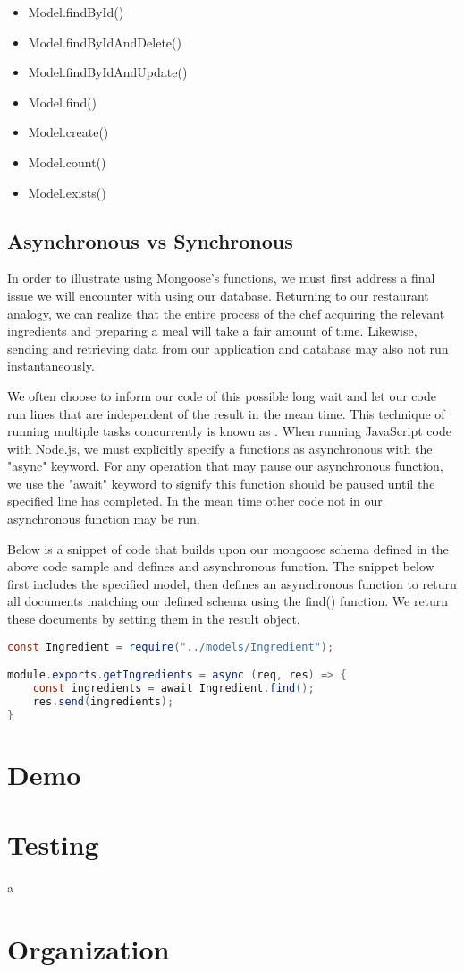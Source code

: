 \begin{itemize}
    \item Model.findById()
    \item Model.findByIdAndDelete()
    \item Model.findByIdAndUpdate()
    \item Model.find()
    \item Model.create()
    \item Model.count()
    \item Model.exists()
\end{itemize}

\subsection{Asynchronous vs Synchronous}

In order to illustrate using Mongoose's functions, we must first address a final issue we will encounter with using our database. Returning to our restaurant analogy, we can realize that the entire process of the chef acquiring the relevant ingredients and preparing a meal will take a fair amount of time. Likewise, sending and retrieving data from our application and database may also not run instantaneously.

We often choose to inform our code of this possible long wait and let our code run lines that are independent of the result in the mean time. This technique of running multiple tasks concurrently is known as . When running JavaScript code with Node.js, we must explicitly specify a functions as asynchronous with the "async" keyword. For any operation that may pause our asynchronous function, we use the "await" keyword to signify this function should be paused until the specified line has completed. In the mean time other code not in our asynchronous function may be run.

Below is a snippet of code that builds upon our mongoose schema defined in the above code sample and defines and asynchronous function. The snippet below first includes the specified model, then defines an asynchronous function to return all documents matching our defined schema using the find() function. We return these documents by setting them in the result object.

\begin{lstlisting}[language=Java]
const Ingredient = require("../models/Ingredient");

module.exports.getIngredients = async (req, res) => {
    const ingredients = await Ingredient.find();
    res.send(ingredients);
}
\end{lstlisting}
    
\section{Demo}

\section{Testing}a

\section{Organization}
